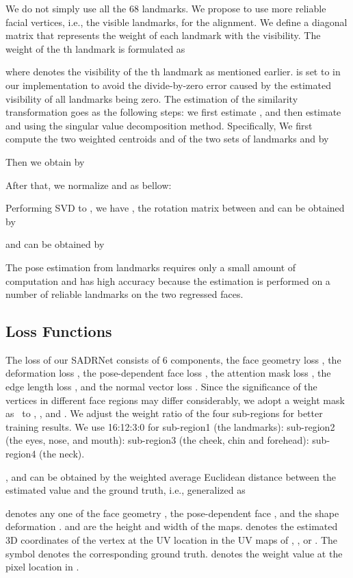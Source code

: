 \documentclass[journal]{IEEEtran}
\begin{document}
	We do not simply use all the 68 landmarks. We propose to use more reliable facial vertices, i.e., the visible landmarks, for the alignment. We define a diagonal matrix  that represents the weight of each landmark with the visibility. The weight of the th landmark is formulated as
	
	where  denotes the visibility of the th landmark as mentioned earlier.  is set to  in our implementation to avoid the divide-by-zero error caused by the estimated visibility of all landmarks being zero.
	The estimation of the similarity transformation goes as the following steps: we first estimate
	, and then estimate  and  using the singular value decomposition method.
	Specifically,
	We first compute the two weighted centroids  and  of the two sets of landmarks  and  by
	
	
	Then we obtain  by
	
	After that, we normalize  and  as bellow:
	
	
	Performing SVD to ,
	we have , the rotation matrix  between  and  can be obtained by
	
	and  can be obtained by
	
	The pose estimation from landmarks requires only a small amount of computation and has high accuracy because the estimation is performed on a number of reliable landmarks on the two regressed faces.
	
	
	
	\subsection{Loss Functions}
	\label{sec:loss}
	The loss of our SADRNet consists of 6 components, the face geometry loss , the deformation loss , the pose-dependent face loss , the attention mask loss , the edge length loss , and the normal vector loss .
	Since the significance of the vertices in different face regions may differ considerably, we adopt a weight mask  as~\cite{PRN} to , , and . We adjust the weight ratio of the four sub-regions for better training results. We use 16:12:3:0 for sub-region1 (the landmarks): sub-region2 (the eyes, nose, and mouth): sub-region3 (the cheek, chin and forehead): sub-region4 (the neck).
	
	, and  can be obtained by the weighted average Euclidean distance between the estimated value and the ground truth, i.e., generalized as
	
	 denotes any one of the face geometry , the pose-dependent face , and the shape deformation .  and  are the height and width of the maps.  denotes the estimated 3D coordinates of the vertex at the UV location  in the UV maps of ,  , or . The symbol  denotes the corresponding ground truth.  denotes the weight value at the pixel location  in .
	
\end{document}
